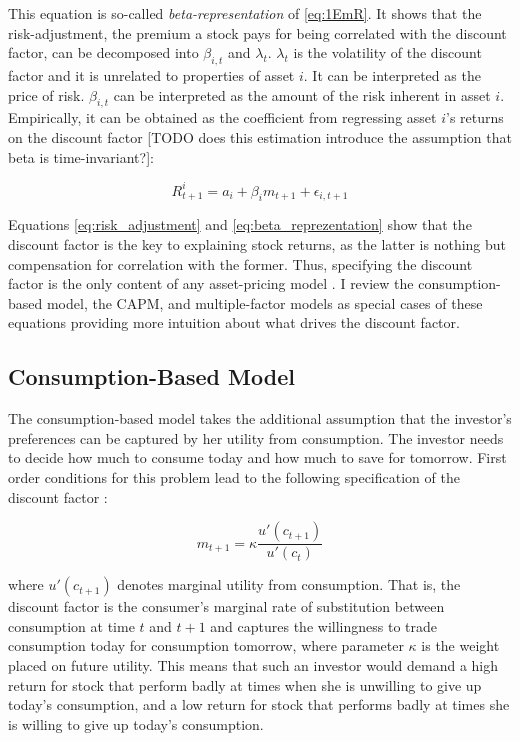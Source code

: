  		This equation is so-called \textit{beta-representation} of \ref{eq:1EmR}. It shows that the risk-adjustment, the premium a stock pays for being correlated with the discount factor, can be decomposed into $\beta_{i,t}$ and $\lambda_t$. $\lambda_t$ is the volatility of the discount factor and it is unrelated to properties of asset $i$. It can be interpreted as the price of risk. $\beta_{i,t}$ can be interpreted as the amount of the risk inherent in asset $i$. Empirically, it can be obtained as the coefficient from regressing asset $i$'s returns on the discount factor [TODO does this estimation introduce the assumption that beta is time-invariant?]: 
 		
 		\begin{equation}
 		R_{t+1}^i = a_i + \beta_{i}m_{t+1} + \epsilon_{i,t+1}
 		\end{equation} 
 		
 		Equations \ref{eq:risk_adjustment} and \ref{eq:beta_reprezentation} show that the discount factor is the key to explaining stock returns, as the latter is nothing but compensation for correlation with the former. Thus, specifying the discount factor is the only content of any asset-pricing model \cite{cochrane2009asset}. I review the consumption-based model, the CAPM, and multiple-factor models as special cases of these equations providing more intuition about what drives the discount factor. 
 			 	
	 	\subsection{Consumption-Based Model}
	 	
		 	The consumption-based model takes the additional assumption that the investor's preferences can be captured by her utility from consumption. The investor needs to decide how much to consume today and how much to save for tomorrow. First order conditions for this problem lead to the following specification of the discount factor \cite{cochrane2009asset}: 
		 	
		 	\begin{equation}
		 		m_{t+1} = \kappa \frac{u'(c_{t+1})}{u'(c_t)} \label{consumtion_based_model}
		 	\end{equation}
		 	
		 	where $u'(c_{t+1})$ denotes marginal utility from consumption. That is, the discount factor is the consumer's  marginal rate of substitution between consumption at time $t$ and $t+1$ and captures the willingness to trade consumption today for consumption tomorrow, where parameter $\kappa$ is the weight placed on future utility. This means that such an investor would demand a high return for stock that perform badly at times when she is unwilling to give up today's consumption, and a low return for stock that performs badly at times she is willing to give up today's consumption. 
		 	
